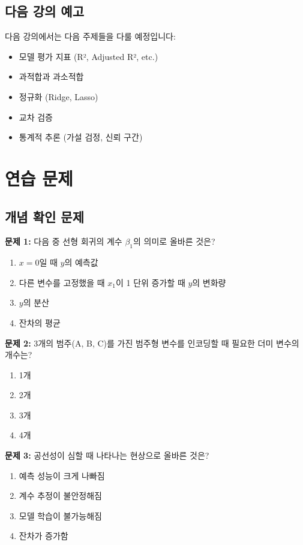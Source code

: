 \documentclass[12pt]{article}
\begin{document}
\subsection{다음 강의 예고}

다음 강의에서는 다음 주제들을 다룰 예정입니다:
\begin{itemize}
    \item 모델 평가 지표 (R², Adjusted R², etc.)
    \item 과적합과 과소적합
    \item 정규화 (Ridge, Lasso)
    \item 교차 검증
    \item 통계적 추론 (가설 검정, 신뢰 구간)
\end{itemize}

\section{연습 문제}

\subsection{개념 확인 문제}

\textbf{문제 1:} 다음 중 선형 회귀의 계수 $\beta_1$의 의미로 올바른 것은?
\begin{enumerate}[label=(\alph*)]
    \item $x=0$일 때 $y$의 예측값
    \item 다른 변수를 고정했을 때 $x_1$이 1 단위 증가할 때 $y$의 변화량
    \item $y$의 분산
    \item 잔차의 평균
\end{enumerate}

\textbf{문제 2:} 3개의 범주(A, B, C)를 가진 범주형 변수를 인코딩할 때 필요한 더미 변수의 개수는?
\begin{enumerate}[label=(\alph*)]
    \item 1개
    \item 2개
    \item 3개
    \item 4개
\end{enumerate}

\textbf{문제 3:} 공선성이 심할 때 나타나는 현상으로 올바른 것은?
\begin{enumerate}[label=(\alph*)]
    \item 예측 성능이 크게 나빠짐
    \item 계수 추정이 불안정해짐
    \item 모델 학습이 불가능해짐
    \item 잔차가 증가함
\end{enumerate}
\end{document}
